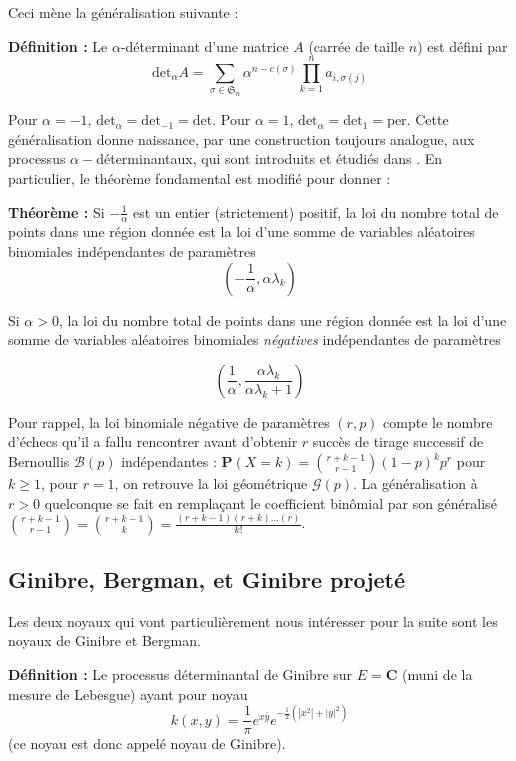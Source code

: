 \documentclass[12pt]{article}
\let\oldsum\sum
\renewcommand{\sum}{\oldsum\limits}
\begin{document}
Ceci mène la généralisation suivante :

\textbf{Définition :} Le $\alpha$-déterminant d'une matrice $A$ (carrée de taille $n$) est défini par $$ \mathrm{det}_\alpha A = \sum_{\sigma \in \mathfrak S_n} \alpha^{n-c(\sigma)}\prod_{k=1}^n a_{i,\sigma(j)} $$ 

Pour $\alpha = -1$, $ \mathrm{det}_\alpha = \mathrm{det}_{-1} = \mathrm{det} $. Pour $\alpha = 1$, $ \mathrm{det}_\alpha = \mathrm{det}_{1} = \mathrm{per} $. Cette généralisation donne naissance, par une construction toujours analogue, aux processus $\alpha-$déterminantaux, qui sont introduits et étudiés dans \cite{VereJones1997}. En particulier, le théorème fondamental est modifié pour donner :

\textbf{Théorème :} Si $- \frac 1 \alpha$ est un entier (strictement) positif, la loi du nombre total de points dans une région donnée est la loi d'une somme de variables aléatoires binomiales indépendantes de paramètres $$(-\frac 1 \alpha, \alpha \lambda_k)$$

Si $\alpha > 0$, la loi du nombre total de points dans une région donnée est la loi d'une somme de variables aléatoires binomiales \textit{négatives} indépendantes de paramètres 

$$(\frac 1 \alpha, \frac{\alpha \lambda_k}{\alpha \lambda_k + 1})$$

Pour rappel, la loi binomiale négative de paramètres $(r,p)$ compte le nombre d'échecs qu'il a fallu rencontrer avant d'obtenir $r$ succès de tirage successif de Bernoullis $\mathcal B(p)$ indépendantes : $\mathbf P(X = k) = \binom{r+k-1}{r-1}(1-p)^kp^r$ pour $k\geqslant 1$, pour $r=1$, on retrouve la loi géométrique $\mathcal G(p)$. La généralisation à $ r > 0 $ quelconque se fait en remplaçant le coefficient binômial par son généralisé $ \binom{r+k-1}{r-1} = \binom{r+k-1}{k}= \frac{(r+k-1)(r+k)...(r)}{k!}$.

\subsection{Ginibre, Bergman, et Ginibre projeté}

Les deux noyaux qui vont particulièrement nous intéresser pour la suite sont les noyaux de Ginibre et Bergman.

\textbf{Définition :} Le processus déterminantal de Ginibre sur $ E = \mathbf C $ (muni de la mesure de Lebesgue) ayant pour noyau $$ k(x,y) = \frac 1 \pi e^{x \overline y} e^{- \frac 1 2 (|x^2| + |y|^2)} $$ (ce noyau est donc appelé noyau de Ginibre).
\end{document}
